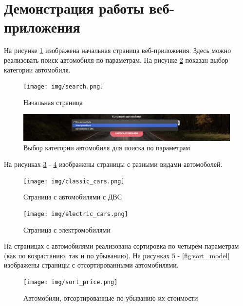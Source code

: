 \documentclass[a4paper,14pt, unknownkeysallowed]{extreport}
\begin{document}
\clearpage

\section{Демонстрация работы веб-приложения}

На рисунке \ref{fig:search} изображена начальная страница веб-приложения. Здесь можно реализовать поиск автомобиля по параметрам. На рисунке \ref{fig:category} показан выбор категории автомобиля. 

\begin{figure}[h]
	\centering
	\texttt{[image: img/search.png]}
	\caption{Начальная страница}
	\label{fig:search}
\end{figure} 

\begin{figure}[h]
	\centering
	\includegraphics[scale=0.35]{img/category.png}
	\caption{Выбор категории автомобиля для поиска по параметрам}
	\label{fig:category}
\end{figure} 

\clearpage

На рисунках \ref{fig:classic_cars} - \ref{fig:electric_cars} изображены страницы с разными видами автомоболей.

\begin{figure}[h]
	\centering
	\texttt{[image: img/classic\_cars.png]}
	\caption{Страница с автомобилями с ДВС}
	\label{fig:classic_cars}
\end{figure} 

\begin{figure}[h]
	\centering
	\texttt{[image: img/electric\_cars.png]}
	\caption{Страница с электромобилями}
	\label{fig:electric_cars}
\end{figure} 

\clearpage

На страницах с автомобилями реализована сортировка по четырём параметрам (как по возрастанию, так и по убыванию).
На рисунках \ref{fig:sort_price} - \ref{fig:sort_model} изображены страницы с отсортированными автомобилями.

\begin{figure}[h]
	\centering
	\texttt{[image: img/sort\_price.png]}
	\caption{Автомобили, отсортированные по убыванию их стоимости}
	\label{fig:sort_price}
\end{figure} 
\end{document}
